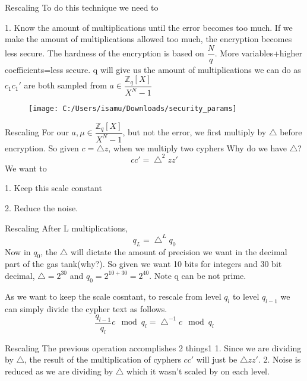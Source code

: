 \documentclass{beamer}
\begin{document}
	\begin{frame}{Rescaling}
		To do this technique we need to 
		
		1. Know the amount of multiplications until the error becomes too much. If we make the amount of multiplications allowed too much, the encryption becomes less secure. The hardness of the encryption is based on $\dfrac{N}{q}$. More variables+higher coefficients=less secure. q will give us the amount of multiplications we can do as $c_1c_1'$ are both sampled from $a \in \dfrac{\mathbb{Z}_{q}[X]}{X^N-1}$
		\begin{figure}
			\centering
			\texttt{[image: C:/Users/isamu/Downloads/security\_params]}
		\end{figure}
	\end{frame}
	\begin{frame}{Rescaling}
		For our $a, \mu \in \dfrac{\mathbb{Z}_{q}[X]}{X^N-1}$, but not the error, we first multiply by $\bigtriangleup$ before encryption. So given $c=\bigtriangleup z$, when we multiply two cyphers
		Why do we have $\bigtriangleup$?
		\begin{equation*}
			cc'=\bigtriangleup^2 zz'
		\end{equation*}
		We want to 
		
		1. Keep this scale constant
		
		2. Reduce the noise.
	\end{frame}
	\begin{frame}{Rescaling}		
		After L multiplications, 
		\begin{equation*}
			q_{L} = \bigtriangleup^L q_0
		\end{equation*}
		Now in $q_0$, the $\bigtriangleup$ will dictate the amount of precision we want in the decimal part of the gas tank(why?). So given we want 10 bits for integers and 30 bit decimal, $\bigtriangleup = 2^{30}$ and $q_0=2^{10+30}=2^{40}$. Note q can be not prime.
		
		As we want to keep the scale cosntant, to rescale from level $q_l$ to level $q_{l-1}$ we can simply divide the cypher text as follows.
		\begin{equation*}
			\dfrac{q_{l-1}}{q_l}c \mod q_l = \bigtriangleup^{-1} c \mod q_l
		\end{equation*}
	\end{frame}
	\begin{frame}{Rescaling}
		The previous operation accomplishes 2 things1
		1. Since we are dividing by $\bigtriangleup$, the result of the multiplication of cyphers $cc'$ will just be $\bigtriangleup zz'$.
		2. Noise is reduced as we are dividing by $\bigtriangleup$ which it wasn't scaled by on each level.
	\end{frame}
\end{document}
